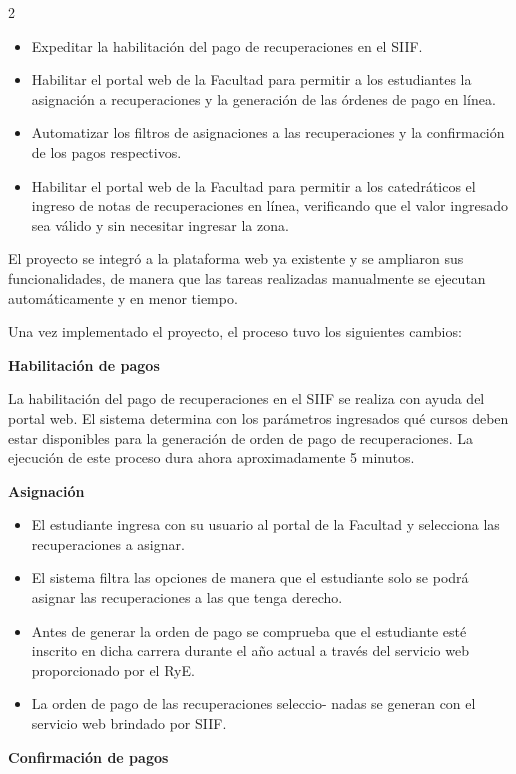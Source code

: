 \documentclass[12pt,spanish,Letterpaper,openany]{book}
\begin{document}
\begin {multicols}{2}
\begin{itemize}
\item
  Expeditar la habilitación del pago de recuperaciones en el SIIF.
\item
  Habilitar el portal web de la Facultad para permitir a los estudiantes la asignación a recuperaciones y la generación de las órdenes de pago en línea.
\item
  Automatizar los filtros de asignaciones a las recuperaciones y la confirmación de los pagos respectivos.
\item
  Habilitar el portal web de la Facultad para permitir a los catedráticos el ingreso de notas de recuperaciones en línea, verificando que el valor ingresado sea válido y sin necesitar ingresar la zona.
\end{itemize}

El proyecto se integró a la plataforma web ya existente y se ampliaron sus funcionalidades, de manera que las tareas realizadas manualmente se ejecutan automáticamente y en menor tiempo.

Una vez implementado el proyecto, el proceso tuvo los siguientes cambios:

\textbf{Habilitación de pagos}

La habilitación del pago de recuperaciones en el SIIF se realiza con ayuda del portal web. El sistema determina con los parámetros ingresados qué cursos deben estar disponibles para la generación de orden de pago de recuperaciones. La ejecución de este proceso dura ahora aproximadamente 5 minutos.

\textbf{Asignación }

\begin{itemize}
\item
  El estudiante ingresa con su usuario al portal de la Facultad y selecciona las recuperaciones a asignar.
\item
  El sistema filtra las opciones de manera que el estudiante solo se podrá asignar las recuperaciones a las que tenga derecho.
\item
  Antes de generar la orden de pago se comprueba que el estudiante esté inscrito en dicha carrera durante el año actual a través del servicio web proporcionado por el RyE.
\item
  La orden de pago de las recuperaciones seleccio-
  nadas se generan con el servicio web brindado por SIIF.
\end{itemize}

\textbf{Confirmación de pagos}


\end{multicols}
\end{document}
